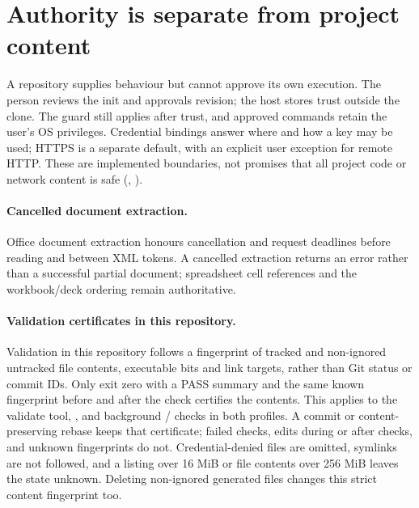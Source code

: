 \section{Authority is separate from project content}

A repository supplies behaviour but cannot approve its own execution. The person
reviews the init and approvals revision; the host stores trust outside the clone.
The guard still applies after trust, and approved commands retain the user's OS
privileges. Credential bindings answer where and how a key may be used; HTTPS is
a separate default, with an explicit user exception for remote HTTP. These are
implemented boundaries, not promises that all project code or network content is
safe (, ).

\paragraph{Cancelled document extraction.}
Office document extraction honours cancellation and request deadlines before
reading and between XML tokens. A cancelled extraction returns an error rather
than a successful partial document; spreadsheet cell references and the
workbook/deck ordering remain authoritative.

\paragraph{Validation certificates in this repository.}
Validation in this repository follows a fingerprint of tracked and non-ignored
untracked file contents, executable bits and link targets, rather than Git
status or commit IDs. Only exit zero with a PASS summary and the same known
fingerprint before and after the check certifies the contents. This applies to
the validate tool, , and background / checks in
both profiles. A commit or content-preserving rebase keeps that certificate;
failed checks, edits during or after checks, and unknown fingerprints do not.
Credential-denied files are omitted, symlinks are not followed, and a listing
over 16 MiB or file contents over 256 MiB leaves the state unknown. Deleting
non-ignored generated files changes this strict content fingerprint too.
